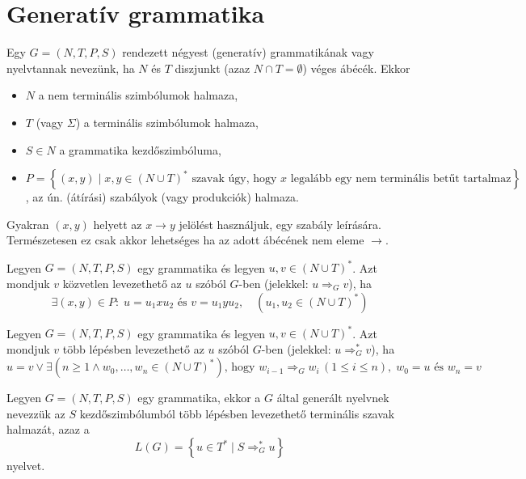 \section{Generatív grammatika}
\begin{definition*}[grammatika]
	Egy $ G = (N, T, P, S) $ rendezett négyest (generatív) grammatikának vagy nyelvtannak nevezünk, ha $N$ és $T$ diszjunkt (azaz $N \cap T = \emptyset $) véges ábécék. Ekkor 
	\begin{itemize}
		\item $N$ a nem terminális szimbólumok halmaza,
		\item $T$ (vagy $ \Sigma $) a terminális szimbólumok halmaza,
		\item $S \in N$ a grammatika kezdőszimbóluma,
		\item $P = \left\lbrace (x,y) \; | \; x,y \in \left( N \cup T \right)^*  \text{ szavak úgy, hogy } x \text{ legalább egy nem terminális betűt tartalmaz} \right\rbrace $, az ún. (átírási) szabályok (vagy produkciók) halmaza.
	\end{itemize}
\end{definition*}

\begin{notation*}
	Gyakran $(x,y)$ helyett az $x \rightarrow y$ jelölést használjuk, egy szabály leírására. Természetesen ez csak akkor lehetséges ha az adott ábécének nem eleme $\rightarrow$. 
\end{notation*}
\vspace{6pt}
\begin{definition*}
	Legyen $ G = (N, T, P, S) $ egy grammatika és legyen $u, v \in (N \cup T)^*$. Azt mondjuk $v$ közvetlen levezethető az $u$ szóból $G$-ben (jelekkel: $ u \Rightarrow_G v $), ha
	\[
	\exists (x, y) \in P: \; u = u_1xu_2 \text{ és } v = u_1yu_2, \quad \left(u_1, u_2 \in (N \cup T)^*\right)
	\]  
\end{definition*}
\vspace{6pt}
\begin{definition*}
	Legyen $ G = (N, T, P, S) $ egy grammatika és legyen $u, v \in (N \cup T)^*$. Azt mondjuk $v$ több lépésben levezethető az $u$ szóból $G$-ben (jelekkel: $ u \Rightarrow_G^* v $), ha
	\[
	u = v \lor \exists \left( n \ge 1 \land w_0,\dots,w_n \in (N \cup T)^* \right)  \text{, hogy } w_{i-1} \Rightarrow_G w_i \, (1 \le i \le n), \; w_0 = u \text{ és } w_n = v
	\]
\end{definition*}
\vspace{6pt}
\begin{definition*}
	Legyen $ G = (N, T, P, S) $ egy grammatika, ekkor a $G$ által generált nyelvnek nevezzük az $S$ kezdőszimbólumból több lépésben levezethető terminális szavak halmazát, azaz a
	\[
		L(G) = \left\lbrace u \in T^* \; | \; S \Rightarrow_G^* u \right\rbrace 
	\]
	nyelvet.
\end{definition*}

